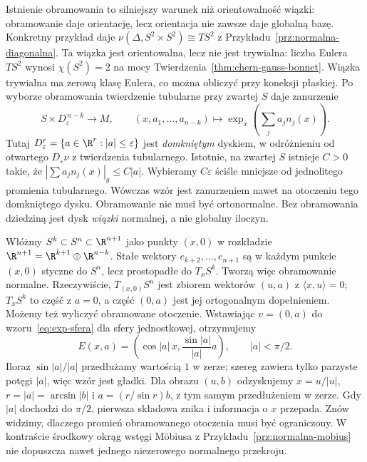 Istnienie obramowania to silniejszy
warunek niż orientowalność wiązki:
obramowanie daje orientację, lecz
orientacja nie zawsze daje globalną
bazę. Konkretny przykład daje
$\nu(\Delta,S^2\times S^2)\cong TS^2$
z Przykładu~\ref{prz:normalna-diagonalna}.
Ta wiązka jest orientowalna, lecz nie jest trywialna:
liczba Eulera $TS^2$ wynosi $\chi(S^2)=2$
na mocy Twierdzenia~\ref{thm:chern-gauss-bonnet}.
Wiązka trywialna ma zerową klasę Eulera, co można obliczyć
przy koneksji płaskiej.
Po wyborze obramowania
twierdzenie tubularne przy zwartej
$S$ daje zanurzenie
\begin{equation}\label{eq:obramowany-dysk}
 S\times D^{\,n-k}_{\varepsilon}
 \longrightarrow M,\qquad
 (x,a_1,\ldots,a_{n-k})
 \longmapsto
 \exp_x\!\left(\sum_j a_jn_j(x)\right).
\end{equation}
Tutaj $D^r_\varepsilon=\{a\in\R^r:|a|\leq\varepsilon\}$
jest \emph{domkniętym} dyskiem, w odróżnieniu od otwartego
$D_\varepsilon\nu$ z twierdzenia tubularnego.
Istotnie, na zwartej $S$ istnieje $C>0$ takie, że
$|\sum a_jn_j(x)|_g\leq C|a|$. Wybieramy
$C\varepsilon$ ściśle mniejsze od jednolitego promienia
tubularnego. Wówczas wzór jest zanurzeniem nawet
na otoczeniu tego domkniętego dysku. Obramowanie
nie musi być ortonormalne.
Bez obramowania dziedziną jest
dysk \emph{wiązki} normalnej,
a nie globalny iloczyn.

\begin{przyklad}
Włóżmy $S^k\subset S^n\subset\R^{n+1}$
jako punkty $(x,0)$ w rozkładzie
$\R^{n+1}=\R^{k+1}\oplus\R^{n-k}$.
Stałe wektory $e_{k+2},\ldots,e_{n+1}$
są w każdym punkcie $(x,0)$ styczne
do $S^n$, lecz prostopadłe do $T_xS^k$.
Tworzą więc obramowanie normalne.
Rzeczywiście, $T_{(x,0)}S^n$ jest zbiorem wektorów
$(u,a)$ z $\langle x,u\rangle=0$;
$T_xS^k$ to część z $a=0$, a część $(0,a)$ jest jej
ortogonalnym dopełnieniem.
Możemy też wyliczyć obramowane otoczenie.
Wstawiając $v=(0,a)$ do wzoru~\eqref{eq:exp-sfera}
dla sfery jednostkowej, otrzymujemy
\[
 E(x,a)=\left(\cos|a|\,x,\frac{\sin|a|}{|a|}a\right),
 \qquad |a|<\pi/2.
\]
Iloraz $\sin|a|/|a|$ przedłużamy wartością $1$ w zerze;
szereg zawiera tylko parzyste potęgi $|a|$, więc wzór jest gładki.
Dla obrazu $(u,b)$ odzyskujemy $x=u/|u|$,
$r=|a|=\arcsin|b|$ i $a=(r/\sin r)b$, z tym samym
przedłużeniem w zerze.
Gdy $|a|$ dochodzi do $\pi/2$, pierwsza składowa znika
i informacja o $x$ przepada. Znów widzimy,
dlaczego promień obramowanego otoczenia musi być ograniczony.
W kontraście środkowy okrąg wstęgi
Möbiusa z Przykładu~\ref{prz:normalna-mobius}
nie dopuszcza nawet jednego
niezerowego normalnego przekroju.
\end{przyklad}

